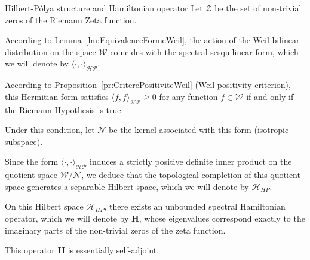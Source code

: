 \documentclass[Riemann_Hypothesis.tex]{subfiles}
\begin{document}
\begin{lemmaEn}[label=lm:ConstructionMetriqueHP]{Hilbert-Pólya structure and Hamiltonian operator}
    Let $\mathcal{Z}$ be the set of non-trivial zeros of the Riemann Zeta function.\par
    According to Lemma~\ref{lm:EquivalenceFormeWeil}, 
    the action of the Weil bilinear distribution on the space $\mathcal{W}$ 
    coincides with the spectral sesquilinear form, which we 
    will denote by $\langle \cdot, \cdot \rangle_{\mathcal{HP}}$. \par
    According to {Proposition}~\ref{pr:CriterePositiviteWeil} (Weil positivity 
    criterion), this Hermitian form satisfies $\langle f, f \rangle_{\mathcal{HP}} 
    \geq 0$ for any function $f \in \mathcal{W}$ if and only if the Riemann 
    Hypothesis is true. \par
    Under this condition, let $\mathcal{N}$ be the kernel associated with this form 
    (isotropic subspace). \par
    Since the form $\langle \cdot, \cdot \rangle_{\mathcal{HP}}$ induces a 
    strictly positive definite inner product on the quotient space 
    $\mathcal{W} / \mathcal{N}$, we deduce that the topological completion of this 
    quotient space generates a separable Hilbert space, which we will denote by 
    $\mathcal{H}_{HP}$. \par
    On this Hilbert space $\mathcal{H}_{HP}$, there exists an unbounded 
    spectral Hamiltonian operator, which we will denote by $\mathbf{H}$, whose 
    eigenvalues correspond exactly to the imaginary parts of the non-trivial 
    zeros of the zeta function. \par
    This operator $\mathbf{H}$ is essentially self-adjoint.
\end{lemmaEn}
\end{document}
